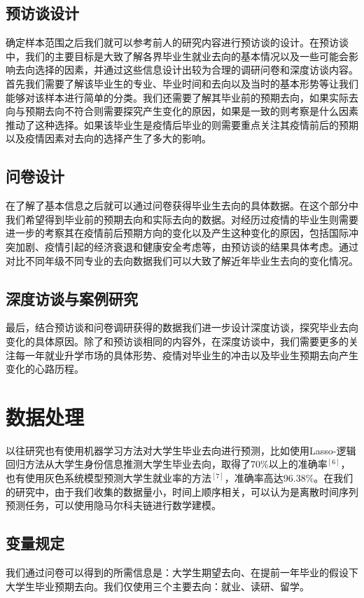 \documentclass[a4paper]{IEEEtran}
\begin{document}
		\subsection{预访谈设计}
		确定样本范围之后我们就可以参考前人的研究内容进行预访谈的设计。在预访谈中，我们的主要目标是大致了解各界毕业生就业去向的基本情况以及一些可能会影响去向选择的因素，并通过这些信息设计出较为合理的调研问卷和深度访谈内容。首先我们需要了解该毕业生的专业、毕业时间和去向以及当时的基本形势等让我们能够对该样本进行简单的分类。我们还需要了解其毕业前的预期去向，如果实际去向与预期去向不符合则需要探究产生变化的原因，如果是一致的则考察是什么因素推动了这种选择。如果该毕业生是疫情后毕业的则需要重点关注其疫情前后的预期以及疫情因素对去向的选择产生了多大的影响。
		\subsection{问卷设计}
		在了解了基本信息之后就可以通过问卷获得毕业生去向的具体数据。在这个部分中我们希望得到毕业前的预期去向和实际去向的数据。对经历过疫情的毕业生则需要进一步的考察其在疫情前后预期方向的变化以及产生这种变化的原因，包括国际冲突加剧、疫情引起的经济衰退和健康安全考虑等，由预访谈的结果具体考虑。通过对比不同年级不同专业的去向数据我们可以大致了解近年毕业生去向的变化情况。
		\subsection{深度访谈与案例研究}
		最后，结合预访谈和问卷调研获得的数据我们进一步设计深度访谈，探究毕业去向变化的具体原因。除了和预访谈相同的内容外，在深度访谈中，我们需要更多的关注每一年就业升学市场的具体形势、疫情对毕业生的冲击以及毕业生预期去向产生变化的心路历程。
		\section{数据处理}
		以往研究也有使用机器学习方法对大学生毕业去向进行预测，比如使用Lasso-逻辑回归方法从大学生身份信息推测大学生毕业去向，取得了70\%以上的准确率$^{[6]}$，也有使用灰色系统模型预测大学生就业率的方法$^{[7]}$，准确率高达96.38\%。在我们的研究中，由于我们收集的数据量小，时间上顺序相关，可以认为是离散时间序列预测任务，可以使用隐马尔科夫链进行数学建模。
		\subsection{变量规定}
		我们通过问卷可以得到的所需信息是：大学生期望去向、在提前一年毕业的假设下大学生毕业预期去向。我们仅使用三个主要去向：就业、读研、留学。
		
\end{document}
